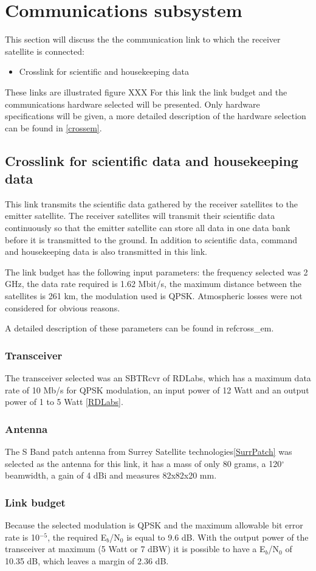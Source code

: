 \section{Communications subsystem}
This section will discuss the  the communication link to which the receiver satellite is connected:
\begin{itemize}
\item Crosslink for scientific and housekeeping data
\end{itemize}

These links are illustrated figure XXX
For this link the link budget and the communications hardware selected will be presented. Only hardware specifications will be given, a more detailed description of the hardware selection can be found in \ref{crossem}.

\subsection{Crosslink for scientific data and housekeeping data}
This link transmits the scientific data gathered by the receiver satellites to the emitter satellite. The receiver satellites will transmit their scientific data continuously so that the emitter satellite can store all data in one data bank before it is transmitted to the ground. In addition to scientific data, command and housekeeping data is also transmitted in this link.

The link budget has the following input parameters: the frequency selected was 2 GHz, the data rate required is 1.62 Mbit/s, the maximum distance between the satellites is 261 km, the modulation used is QPSK. Atmospheric losses were not considered for obvious reasons.

A detailed description of these parameters can be found in ref{cross_em}.

\subsubsection{Transceiver}
The transceiver selected was an SBTRcvr of RDLabs, which has a maximum data rate of 10 Mb/s for QPSK modulation, an input power of 12 Watt and an output power of 1 to 5 Watt \ref{RDLabs}.

\subsubsection{Antenna}
The S Band patch antenna from Surrey Satellite technologies\ref{SurrPatch} was selected as the antenna for this link, it has a mass of only 80 grams, a 120$^{\circ}$ beamwidth, a gain of 4 dBi and measures 82x82x20 mm.

\subsubsection{Link budget}
Because the selected modulation is QPSK and the maximum allowable bit error rate is 10$^{-5}$, the required E$_{b}$/N$_{0}$ is equal to 9.6 dB. With the output power of the transceiver at maximum (5 Watt or 7 dBW) it is possible to have a E$_{b}$/N$_{0}$ of 10.35 dB, which leaves a margin of 2.36 dB.